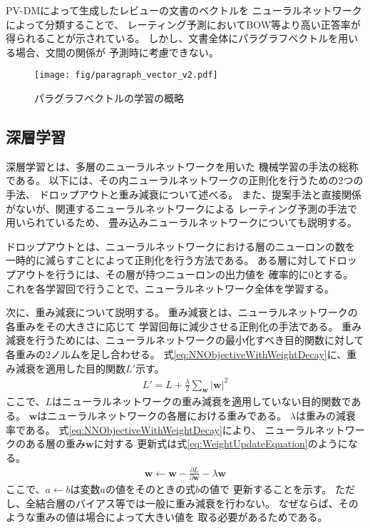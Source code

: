 PV-DMによって生成したレビューの文書のベクトルを
ニューラルネットワークによって分類することで、
レーティング予測においてBOW等より高い正答率が得られることが示されている。
しかし、文書全体にパラグラフベクトルを用いる場合、文間の関係が
予測時に考慮できない。

\begin{figure}
  \texttt{[image: fig/paragraph\_vector\_v2.pdf]}
  \caption{パラグラフベクトルの学習の概略}
  \label{fig:ParagraphVector}
\end{figure}


\subsection{深層学習} \label{ssec:DeepLearning}

深層学習とは、多層のニューラルネットワークを用いた
機械学習の手法の総称である\cite{takayuki15}。
以下には、その内ニューラルネットワークの正則化を行うための2つの手法、
ドロップアウトと重み減衰について述べる。
また、提案手法と直接関係がないが、関連するニューラルネットワークによる
レーティング予測の手法\cite{nal14,rie14,duyu15}で用いられているため、
畳み込みニューラルネットワークについても説明する。

ドロップアウトとは、ニューラルネットワークにおける層のニューロンの数を
一時的に減らすことによって正則化を行う方法である。
ある層に対してドロップアウトを行うには、その層が持つニューロンの出力値を
確率的に0とする。
これを各学習回で行うことで、ニューラルネットワーク全体を学習する。

次に、重み減衰について説明する。
重み減衰とは、ニューラルネットワークの各重みをその大きさに応じて
学習回毎に減少させる正則化の手法である。
重み減衰を行うためには、ニューラルネットワークの最小化すべき目的関数に対して
各重みの2ノルムを足し合わせる。
式\ref{eq:NNObjectiveWithWeightDecay}に、重み減衰を適用した目的関数$L'$示す。
\begin{gather} \label{eq:NNObjectiveWithWeightDecay}
  L' = L + \frac{\lambda}{2} \sum_{\mathbf{w}} {|\mathbf{w}|}^2
\end{gather}
ここで、$L$はニューラルネットワークの重み減衰を適用していない目的関数である。
$\mathbf{w}$はニューラルネットワークの各層における重みである。
$\lambda$は重みの減衰率である。
式\ref{eq:NNObjectiveWithWeightDecay}により、
ニューラルネットワークのある層の重み$\mathbf{w}$に対する
更新式は式\ref{eq:WeightUpdateEquation}のようになる。
\begin{gather} \label{eq:WeightUpdateEquation}
  \mathbf{w} \leftarrow \mathbf{w} - \frac{\partial L}{\partial \mathbf{w}}
                                   - \lambda \mathbf{w}
\end{gather}
ここで、$a \leftarrow b$は変数$a$の値をそのときの式$b$の値で
更新することを示す。
ただし、全結合層のバイアス等では一般に重み減衰を行わない。
なぜならば、そのような重みの値は場合によって大きい値を
取る必要があるためである。


